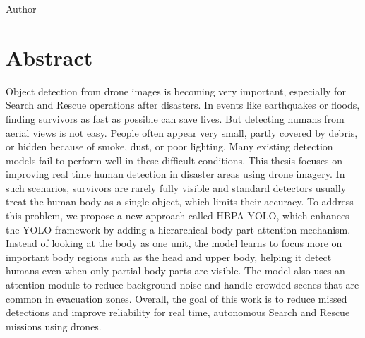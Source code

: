 \documentclass[12pt, a4paper]{report}
\begin{document}
\vspace{0.5in}
\begin{flushright}
    Author
\end{flushright}

\newpage
\chapter*{Abstract}

Object detection from drone images is becoming very important, especially for Search and Rescue operations after disasters. In events like earthquakes or floods, finding survivors as fast as possible can save lives. But detecting humans from aerial views is not easy. People often appear very small, partly covered by debris, or hidden because of smoke, dust, or poor lighting. Many existing detection models fail to perform well in these difficult conditions. This thesis focuses on improving real time human detection in disaster areas using drone imagery. In such scenarios, survivors are rarely fully visible and standard detectors usually treat the human body as a single object, which limits their accuracy. To address this problem, we propose a new approach called HBPA-YOLO, which enhances the YOLO framework by adding a hierarchical body part attention mechanism. Instead of looking at the body as one unit, the model learns to focus more on important body regions such as the head and upper body, helping it detect humans even when only partial body parts are visible. The model also uses an attention module to reduce background noise and handle crowded scenes that are common in evacuation zones. Overall, the goal of this work is to reduce missed detections and improve reliability for real time, autonomous Search and Rescue missions using drones.

\newpage
\tableofcontents

\newpage
{}
\listoftables

\newpage
{}
\listoffigures
\end{document}
